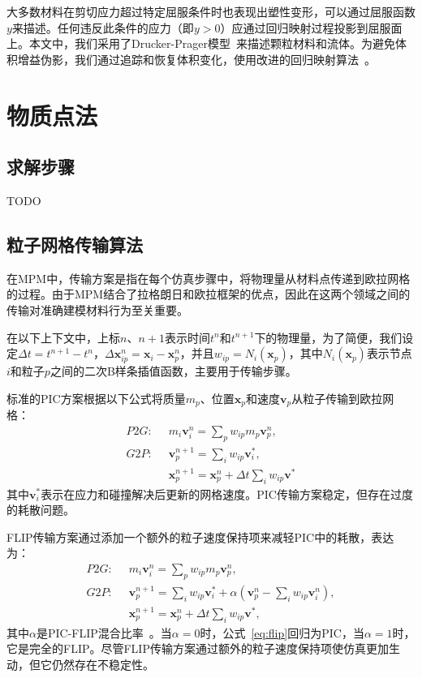 大多数材料在剪切应力超过特定屈服条件时也表现出塑性变形，可以通过屈服函数$y$来描述。任何违反此条件的应力（即$y > 0$）应通过回归映射过程投影到屈服面上。本文中，我们采用了Drucker-Prager模型~\cite{klar2016drucker}来描述颗粒材料和流体。为避免体积增益伪影，我们通过追踪和恢复体积变化，使用改进的回归映射算法~\cite{10.1145/3072959.3073651}。


\section{物质点法}
\subsection{求解步骤}
TODO
\subsection{粒子网格传输算法}
在MPM中，传输方案是指在每个仿真步骤中，将物理量从材料点传递到欧拉网格的过程。由于MPM结合了拉格朗日和欧拉框架的优点，因此在这两个领域之间的传输对准确建模材料行为至关重要。

在以下上下文中，上标$n$、$n+1$表示时间$t^n$和$t^{n+1}$下的物理量，为了简便，我们设定$\Delta t=t^{n+1}-t^n$，$\Delta \mathbf{x}_{ip}^{n}=\mathbf{x}_i-\mathbf{x}_p^n$，并且$w_{ip}=N_i(\mathbf{x}_p)$，其中$N_i(\mathbf{x}_p)$表示节点$i$和粒子$p$之间的二次B样条插值函数，主要用于传输步骤。

标准的PIC方案根据以下公式将质量$m_p$、位置$\mathbf{x}_p$和速度$\mathbf{v}_p$从粒子传输到欧拉网格：
\begin{equation}
    \begin{aligned}
    P2G: \;\;    
    &m_i\mathbf{v}_i^n =\sum_{p}w_{ip}m_p\mathbf{v}_p^n, \\
    G2P:\;\; & \mathbf{v}_p^{n+1}=\sum_iw_{ip}\mathbf{v}_i^*,\\
    &\mathbf{x}_p^{n+1}=\mathbf{x}_p^n+\Delta t\sum_iw_{ip}\mathbf{v^*}
    \end{aligned}
\end{equation}
其中$\mathbf{v}_i^*$表示在应力和碰撞解决后更新的网格速度。PIC传输方案稳定，但存在过度的耗散问题。

FLIP传输方案\cite{zhu2005animating}通过添加一个额外的粒子速度保持项来减轻PIC中的耗散，表达为：
\begin{equation}
    \begin{aligned}
    P2G: \;\;    
    &m_i\mathbf{v}_i^n =\sum_{p}w_{ip}m_p\mathbf{v}_p^n, \\
    G2P:\;\; & \mathbf{v}_p^{n+1}=\sum_iw_{ip}\mathbf{v}_i^* + \alpha(\mathbf{v}_p^n-\sum_iw_{ip}\mathbf{v}_i^n),\\
    &\mathbf{x}_p^{n+1}=\mathbf{x}_p^n+\Delta t\sum_iw_{ip}\mathbf{v^*},
    \end{aligned}
    \label{eq:flip}
\end{equation}
其中$\alpha$是PIC-FLIP混合比率~\cite{bridson2015fluid}。当$\alpha=0$时，公式~\eqref{eq:flip}回归为PIC，当$\alpha=1$时，它是完全的FLIP。尽管FLIP传输方案通过额外的粒子速度保持项使仿真更加生动，但它仍然存在不稳定性。

